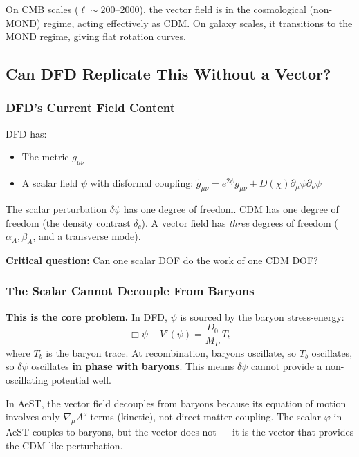 \documentclass[11pt,a4paper]{article}
\begin{document}
On CMB scales ($\ell \sim 200$--$2000$), the vector field is in the cosmological (non-MOND) regime, acting effectively as CDM. On galaxy scales, it transitions to the MOND regime, giving flat rotation curves.

\subsection{Can DFD Replicate This Without a Vector?}

\subsubsection{DFD's Current Field Content}

DFD has:
\begin{itemize}
\item The metric $g_{\mu\nu}$
\item A scalar field $\psi$ with disformal coupling: $\tilde{g}_{\mu\nu} = e^{2\psi}g_{\mu\nu} + D(\chi)\partial_\mu\psi\partial_\nu\psi$
\end{itemize}

The scalar perturbation $\delta\psi$ has one degree of freedom. CDM has one degree of freedom (the density contrast $\delta_c$). A vector field has \emph{three} degrees of freedom ($\alpha_A, \beta_A$, and a transverse mode).

\textbf{Critical question:} Can one scalar DOF do the work of one CDM DOF?

\subsubsection{The Scalar Cannot Decouple From Baryons}

\textbf{This is the core problem.} In DFD, $\psi$ is sourced by the baryon stress-energy:
\begin{equation}
\Box\psi + V'(\psi) = \frac{D_0}{M_P}\,T_b
\end{equation}
where $T_b$ is the baryon trace. At recombination, baryons oscillate, so $T_b$ oscillates, so $\delta\psi$ oscillates \textbf{in phase with baryons}. This means $\delta\psi$ cannot provide a non-oscillating potential well.

In AeST, the vector field decouples from baryons because its equation of motion involves only $\nabla_\mu A^\nu$ terms (kinetic), not direct matter coupling. The scalar $\varphi$ in AeST couples to baryons, but the vector does not --- it is the vector that provides the CDM-like perturbation.
\end{document}
